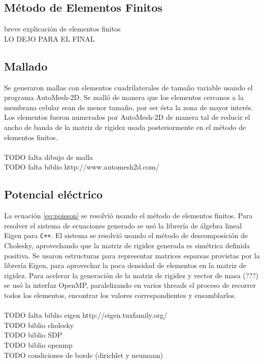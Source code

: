 \documentclass[a4paper,10pt]{article}
\begin{document}
\subsection{Método de Elementos Finitos}
breve explicación de elementos finitos 
\\LO DEJO PARA EL FINAL

%
%

\subsection{Mallado}
Se generaron mallas con elementos cuadrilaterales de tamaño variable usando el programa AutoMesh-2D. Se malló de manera que los elementos cercanos a la membrana celular sean de menor tamaño, por ser ésta la zona de mayor interés. Los elementos fueron numerados por AutoMesh-2D de manera tal de reducir el ancho de banda de la matriz de rigidez usada posteriormente en el método de elementos finitos.\\
\\TODO falta dibujo de malla
\\TODO falta biblio http://www.automesh2d.com/

\subsection{Potencial eléctrico}

La ecuación \ref{eq:poisson} se resolvió usando el método de elementos finitos. Para resolver el sistema de ecuaciones generado se usó la librería de álgebra lineal Eigen para \texttt{C++}. El sistema se resolvió usando el método de descomposición de Cholesky, aprovechando que la matriz de rigidez generada es simétrica definida positiva. Se usaron estructuras para representar matrices esparsas provistas por la librería Eigen, para aprovechar la poca densidad de elementos en la matriz de rigidez. Para acelerar la generación de la matriz de rigidez y vector de masa (???) se usó la interfaz OpenMP, paralelizando en varios threads el proceso de recorrer todos los elementos, encontrar los valores correspondientes y ensamblarlos.\\
\\TODO falta biblio eigen http://eigen.tuxfamily.org/
\\TODO biblio cholesky
\\TODO biblio SDP
\\TODO biblio openmp
\\TODO condiciones de borde (dirichlet y neumann)
\end{document}
